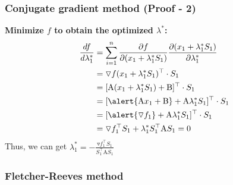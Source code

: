 \documentclass{beamer}
\begin{document}
\begin{frame}
    \frametitle{Conjugate gradient method (Proof - 2)}
\textbf{Minimize $f$ to obtain the optimized $\lambda^*$:}
\begin{align*}
    \frac{df}{d\lambda_1^*}&=\sum^n_{i=1}\frac{\partial f}{\partial (x_1+\lambda_1^*S_1)}\frac{\partial (x_1+\lambda_1^*S_1)}{\partial \lambda_1^*}\\
    &=\triangledown f(x_1+\lambda_1^*S_1)^\top\cdot S_1 \\
    &=[\textrm{A}(x_1+\lambda_1^*S_1)+\textrm{B}]^\top\cdot S_1 \\
    &=[\alert{\textrm{A}x_1+\textrm{B}}+\textrm{A}\lambda_1^*S_1]^\top\cdot S_1 \\
    &=[\alert{\triangledown f_1}+\textrm{A}\lambda_1^*S_1]^\top\cdot S_1 \\
    &=\triangledown f_1^\top S_1+\lambda_1^*S_1^\top \textrm{A}S_1=0
\end{align*}
Thus, we can get $\lambda_1^*=-\frac{\triangledown f_1^\top S_1}{S_1^\top \textrm{A}S_1}$
\end{frame}

\begin{frame}
    \frametitle{Fletcher-Reeves method}
    
\end{frame}
\end{document}
